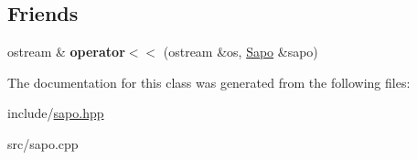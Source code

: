 \subsection*{Friends}
\begin{DoxyCompactItemize}
\item 
\mbox{\label{classSapo_a68602cd46f03c06dd19950f8e1e20346}} 
ostream \& {\bfseries operator$<$$<$} (ostream \&os, \hyperlink{classSapo}{Sapo} \&sapo)
\end{DoxyCompactItemize}


The documentation for this class was generated from the following files\+:\begin{DoxyCompactItemize}
\item 
include/\hyperlink{sapo_8hpp}{sapo.\+hpp}\item 
src/sapo.\+cpp\end{DoxyCompactItemize}
